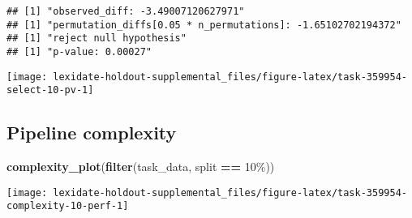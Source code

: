 \documentclass[
]{book}
\newenvironment{Shaded}{\begin{snugshade}}{\end{snugshade}}
\newcommand{\AttributeTok}[1]{\textcolor[rgb]{0.13,0.29,0.53}{#1}}
\newcommand{\DecValTok}[1]{\textcolor[rgb]{0.00,0.00,0.81}{#1}}
\newcommand{\FunctionTok}[1]{\textcolor[rgb]{0.13,0.29,0.53}{\textbf{#1}}}
\newcommand{\NormalTok}[1]{#1}
\newcommand{\OtherTok}[1]{\textcolor[rgb]{0.56,0.35,0.01}{#1}}
\newcommand{\SpecialCharTok}[1]{\textcolor[rgb]{0.81,0.36,0.00}{\textbf{#1}}}
\newcommand{\StringTok}[1]{\textcolor[rgb]{0.31,0.60,0.02}{#1}}
\begin{document}
\begin{Shaded}
\end{Shaded}

\begin{verbatim}
## [1] "observed_diff: -3.49007120627971"
## [1] "permutation_diffs[0.05 * n_permutations]: -1.65102702194372"
## [1] "reject null hypothesis"
## [1] "p-value: 0.00027"
\end{verbatim}

\texttt{[image: lexidate-holdout-supplemental\_files/figure-latex/task-359954-select-10-pv-1]}

\hypertarget{pipeline-complexity-6}{%
\subsection{Pipeline complexity}\label{pipeline-complexity-6}}

\begin{Shaded}
\begin{Highlighting}[]
\FunctionTok{complexity\_plot}\NormalTok{(}\FunctionTok{filter}\NormalTok{(task\_data, split }\SpecialCharTok{==} \StringTok{\textquotesingle{}10\%\textquotesingle{}}\NormalTok{))}
\end{Highlighting}
\end{Shaded}

\texttt{[image: lexidate-holdout-supplemental\_files/figure-latex/task-359954-complexity-10-perf-1]}
\end{document}

